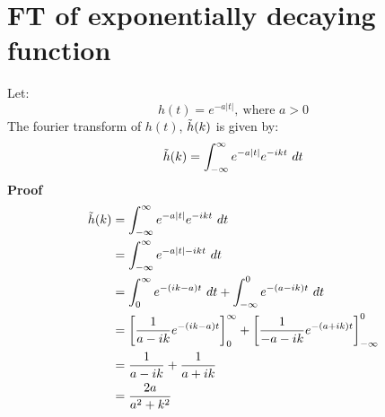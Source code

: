 \documentclass{article}
\begin{document}
\newpage
\section{FT of exponentially decaying function}
Let:
\begin{equation*}
    h(t) = e^{-a|t|}, \ \text{where } a > 0
\end{equation*}
The fourier transform of $h(t)$, $\tilde{h}(k)$ is given by:
\begin{equation*}
    \FT{h} = \intinf e^{-a\abs{t}} e^{-ikt} \ dt
\end{equation*}
\textbf{Proof}
\begin{align*}
    \tilde{h}(k) &= \int_{-\infty}^{\infty} e^{-a\abs{t}} e^{-ikt} \ dt \\
    &= \int_{-\infty}^{\infty} e^{-a\abs{t}-ikt} \ dt \\
    &=\int^\infty_0 e^{-(ik-a)t} \ dt +\int_{-\infty}^0 e^{-(a-ik)t} \ dt \\
    &=\left [ \frac{1}{a-ik}e^{-(ik-a)t} \right ]^\infty_0 
    + \left [ \frac{1}{-a-ik}e^{-(a+ik)t} \right ]^0_{-\infty} \\
    &= \frac{1}{a-ik} + \frac{1}{a+ik}\\
    &= \frac{2a}{a^2+k^2}
\end{align*}
\end{document}

